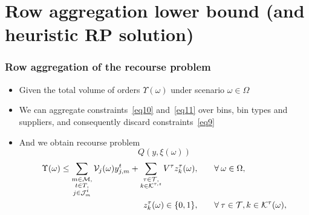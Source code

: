 \documentclass[,9pt,xcolor={dvipsnames}]{beamer} %
\begin{document}
\section{Row aggregation lower bound (and heuristic RP solution)}
\begin{frame}%
	\frametitle{Row aggregation of the recourse problem}
	\begin{itemize}
		\item<1-> Given the total volume of orders $\Upsilon (\omega)$ under scenario $ \omega \in \Omega$
		\bigskip
		\item<2-> We can aggregate constraints~\eqref{eq10} and~\eqref{eq11} over bins, bin types and suppliers, and consequently discard constraints~\eqref{eq9}
		\bigskip
		\item<3-> And we obtain recourse problem
		{
			\small
			\begin{equation*}
				Q \left(y,\xi (\omega)\right)
			\end{equation*}
			\begin{alignat}{2}
				\Upsilon (\omega) \leq \sum\limits_{\substack{ m \in {\cal M}, \\ t \in T, \\ j \in {\cal J}^t_{m}}} {\cal V}_{j}(\omega) y_{j,m}^t + \sum\limits_{\substack{\tau \in {\cal T}, \\ k \in {\cal K}^{\tau,s}}} V^\tau z^{\tau}_k(\omega), & \qquad \forall \: \omega \in \Omega, \label{eq10lb}\\
				z_k^{\tau}(\omega) \in \{0, 1\}, & \qquad \forall \: \tau \in {\cal T}, k \in {\cal K}^{\tau}(\omega), \label{eq14lb}
			\end{alignat}
		}
	\end{itemize}
\end{frame}
\end{document}
